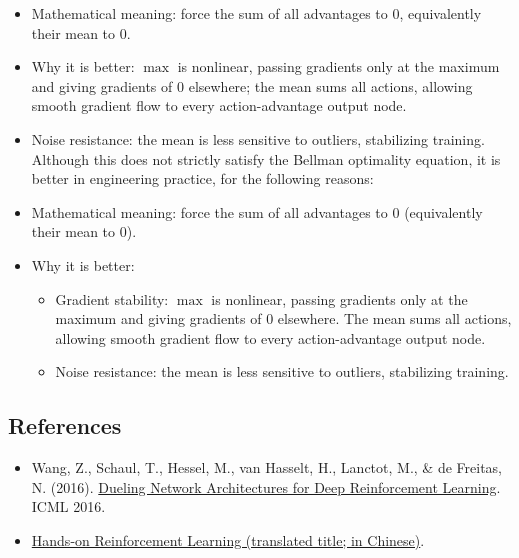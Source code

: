 \begin{itemize}
\item
  Mathematical meaning: force the sum of all advantages to \(0\), equivalently their mean to \(0\).
\item
  Why it is better: \(\max\) is nonlinear, passing gradients only at the maximum and giving gradients of \(0\) elsewhere; the mean sums all actions, allowing smooth gradient flow to every action-advantage output node.
\item
  Noise resistance: the mean is less sensitive to outliers, stabilizing training.
  Although this does not strictly satisfy the Bellman optimality equation, it is better in engineering practice, for the following reasons:
\item
  Mathematical meaning: force the sum of all advantages to \(0\) (equivalently their mean to \(0\)).
\item
{}
  Why it is better:

  \begin{itemize}
  \tightlist
  \item
    Gradient stability: \(\max\) is nonlinear, passing gradients only at the maximum and giving gradients of \(0\) elsewhere. The mean sums all actions, allowing smooth gradient flow to every action-advantage output node.
  \item
    Noise resistance: the mean is less sensitive to outliers, stabilizing training.
  \end{itemize}
\end{itemize}

\FloatBarrier
{}
\hypertarget{references-52}{%
\subsection{References}\label{references-52}}

\vspace{0.25em}
\begin{itemize}
\tightlist
\item
  Wang, Z., Schaul, T., Hessel, M., van Hasselt, H., Lanctot, M., \& de Freitas, N. (2016). \href{https://arxiv.org/abs/1511.06581}{Dueling Network Architectures for Deep Reinforcement Learning}. ICML 2016.
\item
  \href{https://hrl.boyuai.com/}{Hands-on Reinforcement Learning (translated title; in Chinese)}.
\end{itemize}

\clearpage
